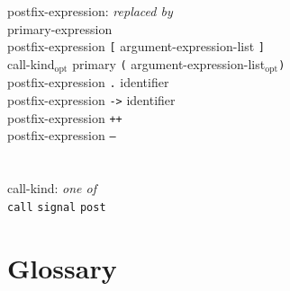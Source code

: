 \documentclass[11pt,letterpaper]{article}
\newcommand{\kw}[1]{{\tt #1}}
\newcommand{\opt}{$_{\mbox{opt}}$\xspace}
\begin{document}
\begin{tabbing}
postfix-expression: \emph{replaced by}\\
\>	primary-expression\\
\>	postfix-expression \kw{[} argument-expression-list \kw{]}\\
\>	call-kind\opt primary \kw{(} argument-expression-list\opt \kw{)}\\
\>	postfix-expression \kw{.} identifier\\
\>	postfix-expression \kw{->} identifier\\
\>	postfix-expression \kw{++}\\
\>	postfix-expression \kw{--}\\
\\\\
call-kind: \emph{one of}\\
\>	\kw{call} \kw{signal} \kw{post}
\end{tabbing} \rm

\section{Glossary}
\label{sec:glossary}
\end{document}
